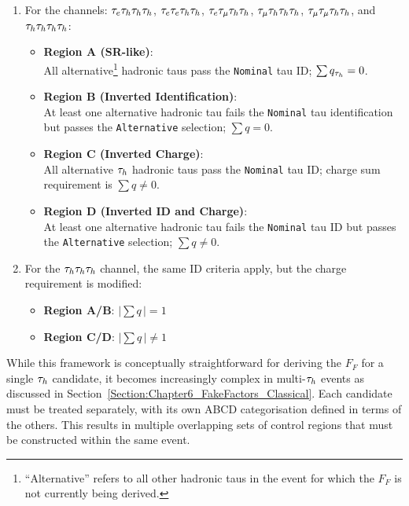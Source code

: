 \begin{enumerate}[label=(\roman*)]
    \item For the channels: $\tau_e\tau_h\tau_h\tau_h$, $\tau_e\tau_e\tau_h\tau_h$, $\tau_e\tau_\mu\tau_h\tau_h$, $\tau_\mu\tau_h\tau_h\tau_h$, $\tau_\mu\tau_\mu\tau_h\tau_h$, and $\tau_h\tau_h\tau_h\tau_h$:
    \begin{itemize}
    \item \textbf{Region A (SR-like)}: \\
    All alternative\footnote{``Alternative'' refers to all other hadronic taus in the event for which the $F_F$ is not currently being derived.} hadronic taus pass the \texttt{Nominal} tau ID; $\sum q_{\tau_h} = 0$.

    \item \textbf{Region B (Inverted Identification)}: \\
    At least one alternative hadronic tau fails the \texttt{Nominal} tau identification but passes the \texttt{Alternative} selection; $\sum q = 0$.

    \item \textbf{Region C (Inverted Charge)}: \\
    All alternative $\tau_h$ hadronic taus pass the \texttt{Nominal} tau ID; charge sum requirement is $\sum q \neq 0$.

    \item \textbf{Region D (Inverted ID and Charge)}: \\
    At least one alternative hadronic tau fails the \texttt{Nominal} tau ID but passes the \texttt{Alternative} selection; $\sum q \neq 0$.
    \end{itemize}

    \item For the $\tau_h\tau_h\tau_h$ channel, the same ID criteria apply, but the charge requirement is modified:
    \begin{itemize}
        \item \textbf{Region A/B}: $|\sum q \,| = 1$
        \item \textbf{Region C/D}: $|\sum q\,| \neq 1$
    \end{itemize}
\end{enumerate}

While this framework is conceptually straightforward for deriving the $F_F$ for a single $\tau_h$ candidate, it becomes increasingly complex in multi-$\tau_h$ events as discussed in Section~\ref{Section:Chapter6_FakeFactors_Classical}. Each candidate must be treated separately, with its own ABCD categorisation defined in terms of the others. This results in multiple overlapping sets of control regions that must be constructed within the same event.

